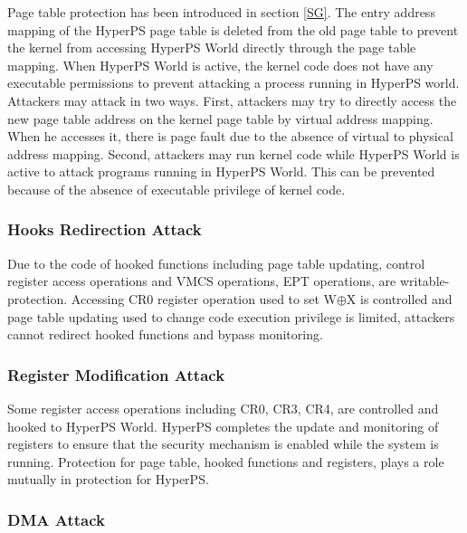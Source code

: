 \documentclass[conference]{IEEEtran}
\begin{document}
Page table protection has been introduced in section \ref{SG}. The entry address mapping of the HyperPS page table is deleted from the old page table to prevent the kernel from accessing HyperPS World directly through the page table mapping. 
When HyperPS World is active, the kernel code does not have any executable permissions to prevent attacking a  process running in HyperPS world.
Attackers may attack in two ways.
First, attackers may try to directly access the new page table address on the kernel page table by virtual address mapping. When he accesses it, there is page fault due to the absence of virtual to physical address mapping.
Second, attackers may run kernel code while HyperPS World is active to attack programs running in HyperPS World. This can be prevented because of the absence of executable privilege of kernel code.



\subsubsection{Hooks Redirection Attack}

Due to the code of hooked functions including page table updating, control register access operations and VMCS operations, EPT operations, are writable-protection. Accessing CR0 register operation used to set W$\oplus${X} is controlled and page table updating used to change code execution privilege is limited, attackers cannot redirect hooked functions and bypass monitoring.

\subsubsection{Register Modification Attack}

Some register access operations including CR0, CR3, CR4, are controlled and hooked to HyperPS World. 
HyperPS completes the update and monitoring of registers to ensure that the security mechanism is enabled while the system is running. 
 Protection for page table, hooked functions and registers, plays a role mutually in protection for HyperPS. 

\subsubsection{DMA Attack}
\end{document}

